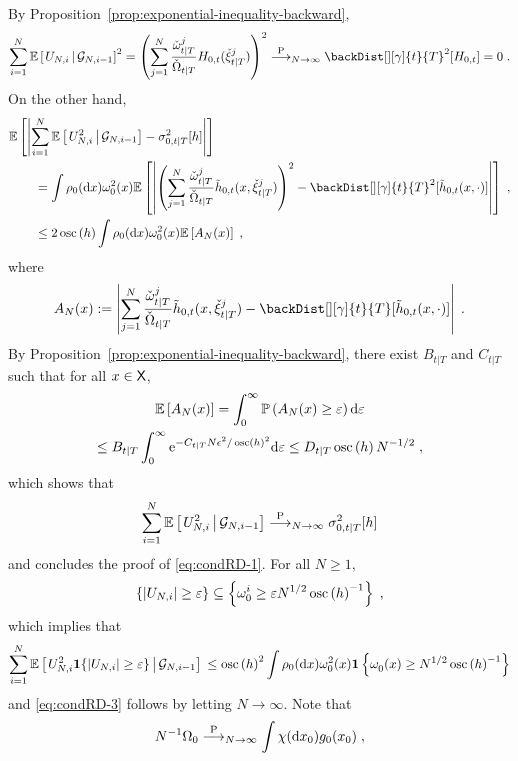 By Proposition~\ref{prop:exponential-inequality-backward},
\[
\sum_{i=1}^N \CPE{U_{N,i}}{\mcg{N,i-1}}^2 = \left( \sum_{j=1}^N \frac{\ebackwght{t}{T}{j}}{\backsumwght{t}{T}} H_{0,t}(\ebackpart{t}{T}{j}) \right)^2  \plim_{N\to\infty} \backDist[][\gamma]{t}{T}^2[H_{0,t}] = 0\eqsp.
\]
On the other hand,
\begin{align*}
\mathbb{E}\left[\left|\sum_{i=1}^N \CPE{U_{N,i}^2}{\mcg{N,i-1}} -\sigma^2_{0,t|T}[h]\right|\right]& \\
&\hspace{-5cm}= \int \XinitIS{0}(\rmd x)\ewght{0}{2}(x) \mathbb{E}\left[\left|\left( \sum_{j=1}^N \frac{\ebackwght{t}{T}{j}}{\backsumwght{t}{T}} \tilde{h}_{0,t}(x,\ebackpart{t}{T}{j}) \right)^2-\backDist[][\gamma]{t}{T}^2[ \tilde{h}_{0,t}(x,\cdot)]\right|\right]\eqsp,\\
&\hspace{-5cm}\le 2\oscnorm{h}\int \XinitIS{0}(\rmd x)\ewght{0}{2}(x)\mathbb{E}\left[A_N(x)\right]\eqsp,
\end{align*}
where
\[
A_N(x)\eqdef\left|\sum_{j=1}^N \frac{\ebackwght{t}{T}{j}}{\backsumwght{t}{T}} \tilde{h}_{0,t}(x,\ebackpart{t}{T}{j})-\backDist[][\gamma]{t}{T}[ \tilde{h}_{0,t}(x,\cdot)]\right|\eqsp.
\]
By Proposition~\ref{prop:exponential-inequality-backward}, there exist $B_{t|T}$ and $C_{t|T}$ such that for all $x\in\mathsf{X}$,
\begin{multline}
\label{eq:L1fromExp}
\mathbb{E}\left[A_N(x)\right] = \int_0^{\infty}\mathbb{P}\left(A_N(x)\ge \varepsilon\right)\rmd \varepsilon \\
\le B_{t|T} \int_0^{\infty}\rme^{-C_{t|T} N \epsilon^2 / \oscnorm{h}^2}\rmd\varepsilon\le D_{t|T}\oscnorm{h}N^{-1/2}\eqsp,
\end{multline}
which shows that
\[
\sum_{i=1}^N \CPE{U_{N,i}^2}{\mcg{N,i-1}}\plim_{N \to \infty}  \sigma^2_{0,t|T}[h]
\]
and concludes the proof of  \eqref{eq:condRD-1}. For all $N\ge 1$,
\begin{equation*}
\{ |U_{N,i}| \geq \varepsilon \}  \subseteq \left\{ \ewght{0}{i} \geq \varepsilon N^{1/2} \oscnorm{h}^{-1} \right\} \eqsp,
\end{equation*}
which implies that
\[
\sum_{i=1}^N \CPE{U_{N,i}^2 \1\{|U_{N,i}| \geq \varepsilon\}}{\mcg{N,i-1}} \\
\leq \oscnorm{h}^2\int \XinitIS{0}(\rmd x) \ewght{0}{2}(x) \1 \left\{ \ewght{0}{}(x) \geq N^{1/2}  \oscnorm{h}^{-1}\right\}
\]
and \eqref{eq:condRD-3} follows by letting $N \to \infty$.  Note that
\[
N^{-1}\sumwght{0}\plim_{N\to\infty}  \int \Xinit(\rmd x_0) g_0(x_0)\eqsp,
\]
